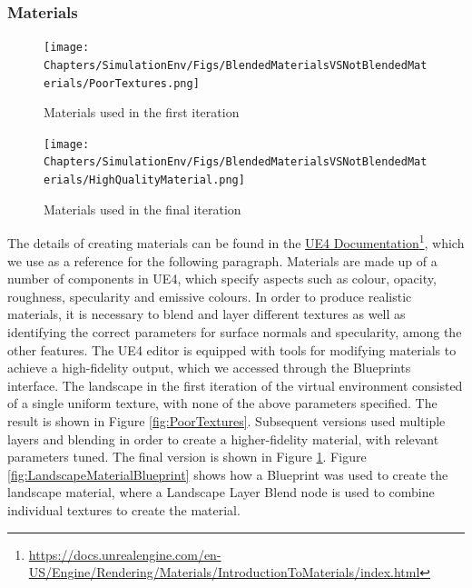 \subsubsection{Materials}


\begin{figure}
    \centering
    \texttt{[image: Chapters/SimulationEnv/Figs/BlendedMaterialsVSNotBlendedMaterials/PoorTextures.png]}
    \caption{Materials used in the first iteration}
    \label{fig:PoorTextures}
    \texttt{[image: Chapters/SimulationEnv/Figs/BlendedMaterialsVSNotBlendedMaterials/HighQualityMaterial.png]}
    \caption{Materials used in the final iteration}
    \label{fig:GoodTextures}
\end{figure}

The details of creating materials can be found in the 
\href{https://docs.unrealengine.com/en-US/Engine/Rendering/Materials/IntroductionToMaterials/index.html}{UE4 Documentation}\footnote{\href {https://docs.unrealengine.com/en-US/Engine/Rendering/Materials/IntroductionToMaterials/index.html}{https://docs.unrealengine.com/en-US/Engine/Rendering/Materials/IntroductionToMaterials/index.html}}, which we use as a reference for the following paragraph.
Materials are made up of a number of components in UE4, which specify aspects such as colour, opacity, roughness, specularity and emissive colours. In order to produce realistic materials, it is necessary to blend and layer different textures as well as identifying the correct parameters for surface normals and specularity, among the other features. The UE4 editor is equipped with tools for modifying materials to achieve a high-fidelity output, which we accessed through the Blueprints interface. The landscape in the first iteration of the virtual environment consisted of a single uniform texture, with none of the above parameters specified. The result is shown in Figure \ref{fig:PoorTextures}. Subsequent versions used multiple layers and blending in order to create a higher-fidelity material, with relevant parameters tuned. The final version is shown in Figure \ref{fig:GoodTextures}. Figure \ref{fig:LandscapeMaterialBlueprint} shows how a Blueprint was used to create the landscape material, where a Landscape Layer Blend node is used to combine individual textures to create the material.

